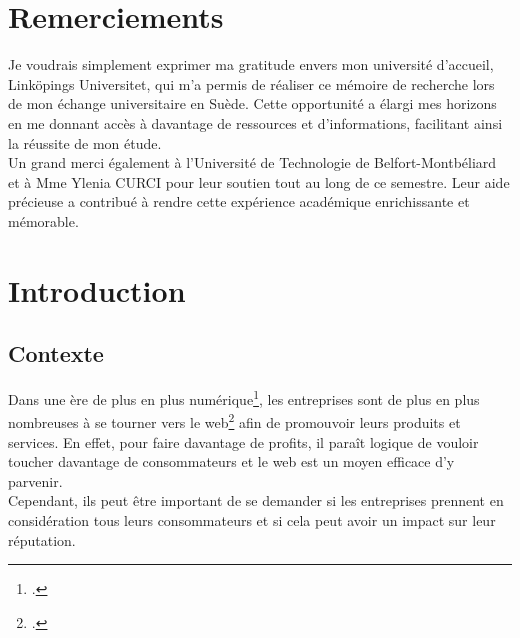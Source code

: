 \documentclass[12pt, a4paper]{report}
\begin{document}
\tahomafont

\makeutbmfrontcover{}

\topmargin -1.5cm
\pagestyle{fancy}
\fancyhf{}
\fancyfoot[C]{\thepage}

\renewcommand{\headrulewidth}{1pt}

\chapter*{Remerciements}

Je voudrais simplement exprimer ma gratitude envers mon université d'accueil, Linköpings Universitet, qui m'a permis de réaliser ce mémoire de recherche lors de mon échange universitaire en Suède. Cette opportunité a élargi mes horizons en me donnant accès à davantage de ressources et d'informations, facilitant ainsi la réussite de mon étude.\\

Un grand merci également à l'Université de Technologie de Belfort-Montbéliard et à Mme Ylenia CURCI pour leur soutien tout au long de ce semestre. Leur aide précieuse a contribué à rendre cette expérience académique enrichissante et mémorable.

\tableofcontents

\chapter{Introduction}

\section{Contexte}

Dans une ère de plus en plus numérique\footcite{noauthor_ere_2023}, les entreprises sont de plus en plus nombreuses à se tourner vers le web\footcite{noauthor_total_nodate} afin de promouvoir leurs produits et services. En effet, pour faire davantage de profits, il paraît logique de vouloir toucher davantage de consommateurs et le web est un moyen efficace d'y parvenir.\\

Cependant, ils peut être important de se demander si les entreprises prennent en considération tous leurs consommateurs et si cela peut avoir un impact sur leur réputation.
\end{document}

